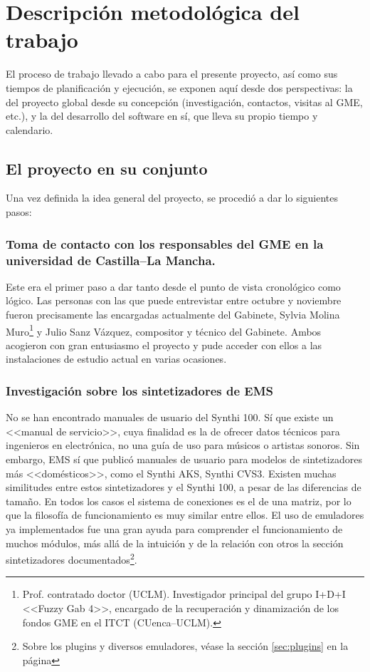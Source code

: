 \chapter{Descripción metodológica del trabajo}

El proceso de trabajo llevado a cabo para el presente proyecto, así como sus tiempos de planificación y ejecución, se exponen aquí desde dos perspectivas: la del proyecto global desde su concepción (investigación, contactos, visitas al GME, etc.), y la del desarrollo del software en sí, que lleva su propio tiempo y calendario. 

\section{El proyecto en su conjunto}

Una vez definida la idea general del proyecto, se procedió a dar lo siguientes pasos:

\subsection{Toma de contacto con los responsables del GME en la universidad de Castilla--La Mancha. }

Este era el primer paso a dar tanto desde el punto de vista cronológico como lógico. Las personas con las que puede entrevistar entre octubre y noviembre fueron precisamente las encargadas actualmente del Gabinete, Sylvia Molina Muro\footnote{Prof. contratado doctor (UCLM). Investigador principal del grupo I+D+I <<Fuzzy Gab 4>>, encargado de la recuperación y dinamización de los fondos GME en el ITCT (CUenca--UCLM).} y Julio Sanz Vázquez, compositor y técnico del Gabinete. Ambos acogieron con gran entusiasmo el proyecto y pude acceder con ellos a las instalaciones de estudio actual en varias ocasiones.

\subsection{Investigación sobre los sintetizadores de EMS}

No se han encontrado manuales de usuario del Synthi 100. Sí que existe un <<manual de servicio>>, cuya finalidad es la de ofrecer datos técnicos para ingenieros en electrónica, no una guía de uso para músicos o artistas sonoros. Sin embargo, EMS sí que publicó manuales de usuario para modelos de sintetizadores más <<domésticos>>, como el Synthi AKS\citeyear{SynthiAKS_brochure}, Synthi CVS3\citeyear{SynthiVCS3_brochure}. Existen muchas similitudes entre estos sintetizadores y el Synthi 100, a pesar de las diferencias de tamaño. En todos los casos el sistema de conexiones es el de una matriz, por lo que la filosofía de funcionamiento es muy similar entre ellos. El uso de emuladores ya implementados fue una gran ayuda para comprender el funcionamiento de muchos módulos, más allá de la intuición y de la relación con otros la sección sintetizadores documentados\footnote{Sobre los plugins y diversos emuladores, véase la sección \ref*{sec:plugins} en la página \pageref{sec:plugins}}.

